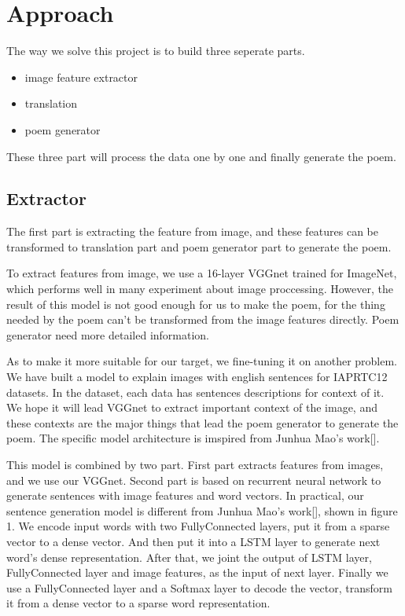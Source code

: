 \documentclass[10pt,twocolumn,letterpaper]{article}
\begin{document}
\section{Approach}
The way we solve this project is to build three seperate parts.
\begin{itemize}
\item image feature extractor
\item translation
\item poem generator
\end{itemize}

These three part will process the data one by one and finally generate the poem.

\subsection{Extractor}
The first part is extracting the feature from image, and these features can be transformed to translation part and poem generator part to generate the poem.

To extract features from image, we use a 16-layer VGGnet trained for ImageNet, which performs well in many experiment about image proccessing. 
However, the result of this model is not good enough for us to make the poem, for the thing needed by the poem can’t be transformed from the image features directly. Poem generator need more detailed information. 

As to make it more suitable for our target, we fine-tuning it on another problem. We have built a model to explain images with english sentences for IAPRTC12 datasets. In the dataset, each data has sentences descriptions for context of it. We hope it will lead VGGnet to extract important context of the image, and these contexts are the major things that lead the poem generator to generate the poem. The specific model architecture is imspired from Junhua Mao’s work[].

This model is combined by two part. First part extracts features from images, and we use our VGGnet. Second part is based on recurrent neural network to generate sentences with image features and word vectors. In practical, our sentence generation model is different from Junhua Mao’s work[], shown in figure 1. We encode input words with two FullyConnected layers, put it from a sparse vector to a dense vector. And then put it into a LSTM layer to generate next word’s dense representation. After that, we joint the output of LSTM layer, FullyConnected layer and image features, as the input of next layer. Finally we use a FullyConnected layer and a Softmax layer to decode the vector, transform it from a dense vector to a sparse word representation.
\end{document}
